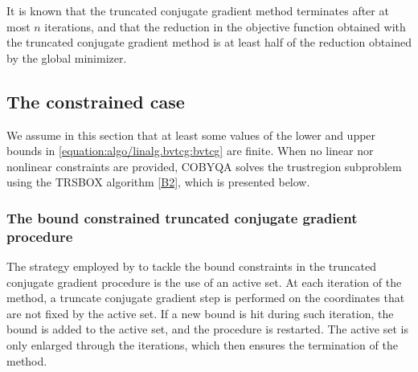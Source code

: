 \documentclass[letterpaper,10pt,english]{sphinxmanual}
\begin{document}
\sphinxAtStartPar
It is known that the truncated conjugate gradient method terminates after at
most \(n\) iterations, and that the reduction in the objective function
obtained with the truncated conjugate gradient method is at least half of the
reduction obtained by the global minimizer.


\subsection{The constrained case}
\label{\detokenize{algo/linalg.bvtcg:the-constrained-case}}
\sphinxAtStartPar
We assume in this section that at least some values of the lower and upper
bounds in \eqref{equation:algo/linalg.bvtcg:bvtcg} are finite. When no linear nor nonlinear constraints are
provided, COBYQA solves the trust\sphinxhyphen{}region subproblem using the TRSBOX algorithm
{[}\hyperlink{cite.algo/linalg.bvtcg:cite-1-bvtcg-powell-2009}{B2}{]}, which is presented below.


\subsubsection{The bound constrained truncated conjugate gradient procedure}
\label{\detokenize{algo/linalg.bvtcg:the-bound-constrained-truncated-conjugate-gradient-procedure}}
\sphinxAtStartPar
The strategy employed by  to tackle the bound constraints in the
truncated conjugate gradient procedure is the use of an active set. At each
iteration of the method, a truncate conjugate gradient step is performed on the
coordinates that are not fixed by the active set. If a new bound is hit during
such iteration, the bound is added to the active set, and the procedure is
restarted. The active set is only enlarged through the iterations, which then
ensures the termination of the method.
\end{document}
